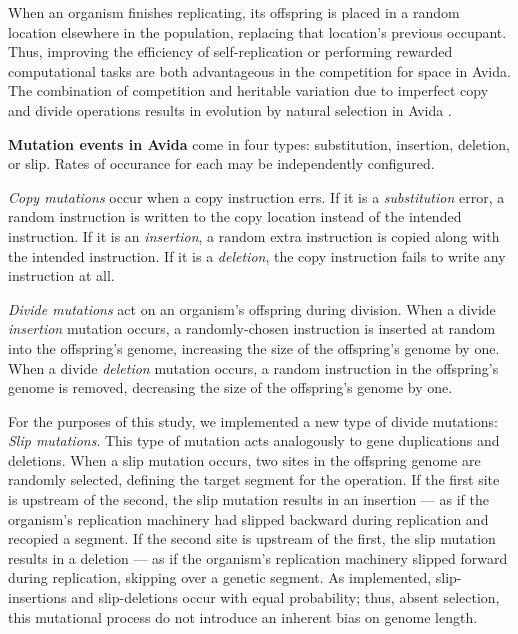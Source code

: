 When an organism finishes replicating, its offspring is placed in a random location elsewhere in the population, replacing that location's previous occupant.
Thus, improving the efficiency of self-replication or performing rewarded computational tasks are both advantageous in the competition for space in Avida. The combination of competition and heritable variation due to imperfect copy and divide operations results in evolution by natural selection in Avida \citep{pennock2007models}.



\medskip
\noindent
\textbf{Mutation events in Avida} come in four types: substitution, insertion, deletion, or slip. Rates of occurance for each may be independently configured.

\textit{Copy mutations} occur when a copy instruction errs.
If it is a \textit{substitution} error, a random instruction is written to the copy location instead of the intended instruction.
If it is an \textit{insertion}, a random extra instruction is copied along with the intended instruction.
If it is a \textit{deletion}, the copy instruction fails to write any instruction at all.

\textit{Divide mutations} act on an organism's offspring during division.
When a divide \textit{insertion} mutation occurs, a randomly-chosen instruction is inserted at random into the offspring's genome, increasing the size of the offspring's genome by one.
When a divide \textit{deletion} mutation occurs, a random instruction in the offspring's genome is removed, decreasing the size of the offspring's genome by one.

For the purposes of this study, we implemented a new type of divide mutations: \textit{Slip mutations}.
This type of mutation acts analogously to gene duplications and deletions.
When a slip mutation occurs, two sites in the offspring genome are randomly selected, defining the target segment for the operation. If the first site is upstream of the second, the slip mutation results in an insertion --- as if the organism's replication machinery had slipped backward during replication and recopied a segment. If the second site is upstream of the first, the slip mutation results in a deletion --- as if the organism's replication machinery slipped forward during replication, skipping over a genetic segment. As implemented, slip-insertions and slip-deletions occur with equal probability; thus, absent selection, this mutational process do not introduce an inherent bias on genome length.

